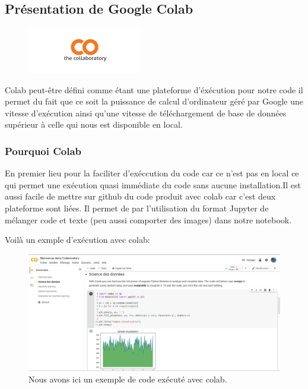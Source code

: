 {\subsection{Présentation de Google Colab}

\begin{figure}[h]
\begin{center}
\includegraphics[width=5cm]{./images/Colab_logo.png}
\end{center}
\end{figure}

Colab peut-être défini comme étant une plateforme d'éxécution pour notre code
il permet du fait que ce soit la puissance de calcul d'ordinateur géré par Google une vitesse d'exécution ainsi qu'une vitesse de téléchargement de base de données supérieur à celle qui nous est disponible en local.

\subsubsection{Pourquoi Colab}
En premier lieu pour la faciliter d'exéccution du code car ce n'est pas en local ce qui permet une exécution quasi immédiate du code sans aucune installation.Il est aussi facile de mettre sur github du code produit avec colab car c'est deux plateforme sont liées. Il permet de par l'utilisation du format Jupyter de mélanger code et texte (peu aussi comporter des images) dans notre notebook.

Voilà un exmple d'exécution avec colab:

\begin{figure}[h]
\begin{center}
\includegraphics[width=15cm]{./images/Cap_colab.PNG}
\caption{Nous avons ici un exemple de code exécuté avec colab.}
\end{center}
\end{figure}


}
